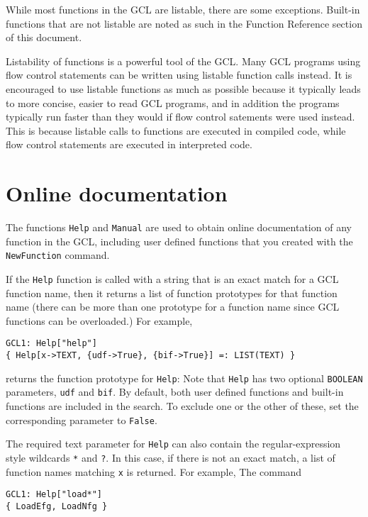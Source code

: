 While most functions in the GCL are listable, there are some
exceptions.  Built-in functions that are not listable are noted as
such in the Function Reference section of this document.

Listability of functions is a powerful tool of the GCL. Many GCL
programs using flow control statements can be written using listable
function calls instead.  It is encouraged to use listable functions as
much as possible because it typically leads to more concise, easier to
read GCL programs, and in addition the programs typically run
faster than they would if flow control satements were used instead.
This is because listable calls to functions are executed in compiled
code, while flow control statements are executed in interpreted code.

\section{Online documentation}

The functions \verb+Help+ and \verb+Manual+ are used to obtain online
documentation of any function in the GCL, including user defined
functions that you created with the \verb+NewFunction+ command. 

If the \verb+Help+ function is called with a string that is an exact
match for a GCL function name, then it returns a list of function
prototypes for that function name (there can be more than one
prototype for a function name since GCL functions can be overloaded.)
For example,

\begin{verbatim}
GCL1: Help["help"]
{ Help[x->TEXT, {udf->True}, {bif->True}] =: LIST(TEXT) }
\end{verbatim}

\noindent
returns the function prototype for \verb+Help+: Note that \verb+Help+
has two optional \verb+BOOLEAN+ parameters, \verb+udf+ and \verb+bif+.
By default, both user defined functions and built-in functions are
included in the search.  To exclude one or the other of these, set the
corresponding parameter to \verb+False+.

The required text parameter for \verb+Help+ can also contain the
regular-expression style wildcards \verb+*+ and \verb+?+.  In this
case, if there is not an exact match, a list of function names
matching \verb+x+ is returned.  For example, The command 

\begin{verbatim}
GCL1: Help["load*"]
{ LoadEfg, LoadNfg }
\end{verbatim}

